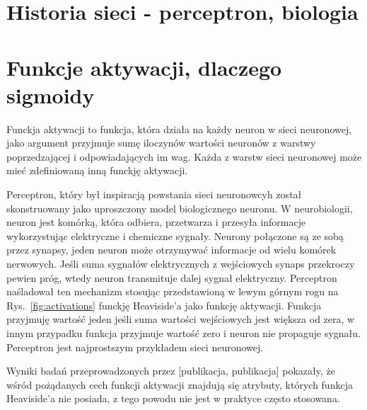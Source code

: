 \documentclass[11pt]{book}
\theoremstyle{definition}
\begin{document}
\section[\color{red}Historia sieci - perceptron, biologia]{Historia sieci - perceptron, biologia}
\section[\color{red}Funkcje aktywacji, dlaczego sigmoidy]{Funkcje aktywacji, dlaczego sigmoidy}
Funckja aktywacji to funkcja, która działa na każdy neuron w sieci neuronowej, jako argument przyjmuje sumę iloczynów wartości neuronów z warstwy poprzedzającej i odpowiadających im wag. Każda z warstw sieci neuronowej może mieć zdefiniowaną inną funckję aktywacji.

Perceptron, który był inspiracją powstania sieci neuronowcyh został skonstruowany jako uproszczony model biologicznego neuronu. W neurobiologii, neuron jest komórką, która odbiera, przetwarza i przesyła informacje wykorzystując elektryczne i chemiczne sygnały. Neurony połączone są ze sobą przez synapsy, jeden neuron może otrzymywać informacje od wielu komórek nerwowych. Jeśli suma sygnałów elektrycznych z wejściowych synaps przekroczy pewien próg, wtedy neuron transmituje dalej sygnał elektryczny. Perceptron naśladował ten mechanizm stosując przedstawioną w lewym górnym rogu na Rys.~\ref{fig:activations} funckję Heaviside'a jako funkcję aktywacji. Funkcja przyjmuję wartość jeden jeśli suma wartości wejściowych jest większa od zera, w innym przypadku funkcja przyjmuje wartość zero i neuron nie propaguje sygnału. Perceptron jest najprostszym przykładem sieci neuronowej.

Wyniki badań przeprowadzonych przez [publikacja, publikacja] pokazały, że wśród pożądanych cech funkcji aktywacji znajdują się atrybuty, których funkcja Heaviside'a nie posiada, z tego powodu nie jest w praktyce często stosowana.
\end{document}
